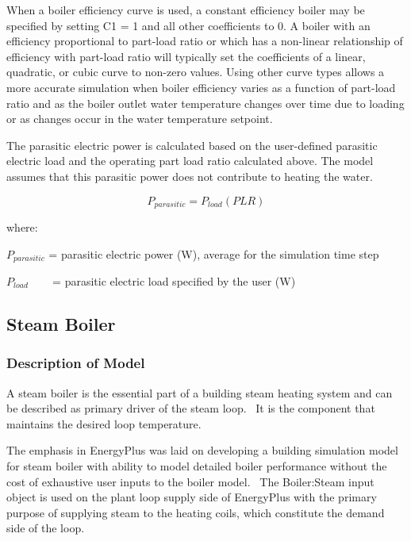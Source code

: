 When a boiler efficiency curve is used, a constant efficiency boiler may be specified by setting C1 = 1 and all other coefficients to 0. A boiler with an efficiency proportional to part-load ratio or which has a non-linear relationship of efficiency with part-load ratio will typically set the coefficients of a linear, quadratic, or cubic curve to non-zero values. Using other curve types allows a more accurate simulation when boiler efficiency varies as a function of part-load ratio and as the boiler outlet water temperature changes over time due to loading or as changes occur in the water temperature setpoint.

The parasitic electric power is calculated based on the user-defined parasitic electric load and the operating part load ratio calculated above. The model assumes that this parasitic power does not contribute to heating the water.

\begin{equation}
{P_{parasitic}} = {P_{load}}\left( {PLR} \right)
\end{equation}

where:

\({P_{parasitic}}\) = parasitic electric power (W), average for the simulation time step

\({P_{load}}\) ~~~ = parasitic electric load specified by the user (W)

\subsection{Steam Boiler}\label{steam-boiler}

\subsubsection{Description of Model}\label{description-of-model}

A steam boiler is the essential part of a building steam heating system and can be described as primary driver of the steam loop.~ It is the component that maintains the desired loop temperature.

The emphasis in EnergyPlus was laid on developing a building simulation model for steam boiler with ability to model detailed boiler performance without the cost of exhaustive user inputs to the boiler model.~ The Boiler:Steam input object is used on the plant loop supply side of EnergyPlus with the primary purpose of supplying steam to the heating coils, which constitute the demand side of the loop.

